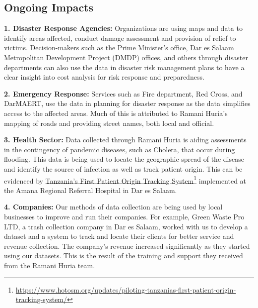 \documentclass[a4paper,12pt,twoside]{article}
\begin{document}
\subsection{Ongoing Impacts}
\begin{multicols}{2}
\textbf{1. Disaster Response Agencies:} Organizations are using maps and data to identify areas affected, conduct damage assessment and provision of relief to victims. Decision-makers such as the Prime Minister's office, Dar es Salaam Metropolitan Development Project (DMDP) offices, and others through disaster departments can also use the data in disaster risk management plans to have a clear insight into cost analysis for risk response and preparedness.

\textbf{2. Emergency Response:} Services such as Fire department, Red Cross, and DarMAERT, use the data in planning for disaster response as the data simplifies access to the affected areas. Much of this is attributed to Ramani Huria's mapping of roads and  providing street names, both local and official.

\textbf{3. Health Sector:} Data collected through Ramani Huria is aiding assessments in the contingency of pandemic diseases, such as Cholera, that occur during flooding. This data is being used to locate the geographic spread of the disease and identify the source of infection as well as track patient origin. This can be evidenced by \href{https://www.hotosm.org/updates/piloting-tanzanias-first-patient-origin-tracking-system/}{Tanzania’s First Patient Origin Tracking System}\protect\footnote{\url{https://www.hotosm.org/updates/piloting-tanzanias-first-patient-origin-tracking-system/}} implemented at the Amana Regional Referral Hospital in Dar es Salaam.

\textbf{4. Companies:} Our methods of data collection are being used by local businesses to improve and run their companies. For example, Green Waste Pro LTD, a trash collection company in Dar es Salaam, worked with us to develop a dataset and a system to track and locate their clients for better service and revenue collection. The company’s revenue increased significantly as they started using our datasets. This is the result of the training and support they received from the Ramani Huria team.


\end{multicols}
\end{document}
